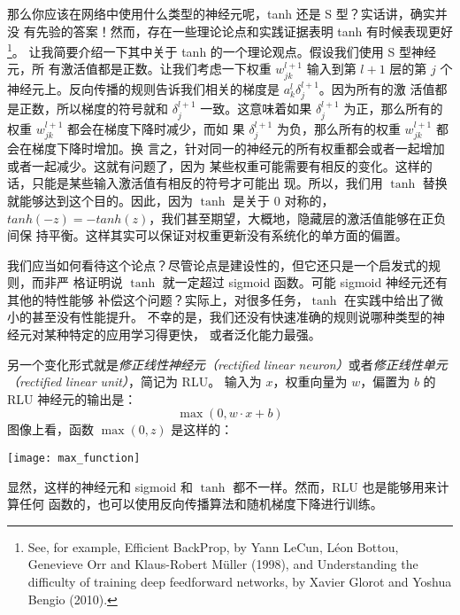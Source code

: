 那么你应该在网络中使用什么类型的神经元呢，tanh 还是 S 型？实话讲，确实并没
有先验的答案！然而，存在一些理论论点和实践证据表明 tanh 有时候表现更好\footnote{See, for example, Efficient BackProp, by Yann LeCun, Léon Bottou, Genevieve Orr and Klaus-Robert Müller (1998), and Understanding the difficulty of training deep feedforward networks, by Xavier Glorot and Yoshua Bengio (2010).}。
让我简要介绍一下其中关于 tanh 的一个理论观点。假设我们使用 S 型神经元，所
有激活值都是正数。让我们考虑一下权重 $w_{jk}^{l+1}$ 输入到第 $l+1$ 层的第 $j$ 个
神经元上。反向传播的规则告诉我们相关的梯度是 $a_k^l\delta_j^{l+1}$。因为所有的激
活值都是正数，所以梯度的符号就和 $\delta_j^{l+1}$ 一致。这意味着如果
$\delta_j^{l+1}$ 为正，那么所有的权重 $w_{jk}^{l+1}$ 都会在梯度下降时减少，而如
果 $\delta_j^{l+1}$ 为负，那么所有的权重 $w_{jk}^{l+1}$ 都会在梯度下降时增加。换
言之，针对同一的神经元的所有权重都会或者一起增加或者一起减少。这就有问题了，因为
某些权重可能需要有相反的变化。这样的话，只能是某些输入激活值有相反的符号才可能出
现。所以，我们用 $\tanh$ 替换就能够达到这个目的。因此，因为 $\tanh$ 是关于 $0$
对称的，$tanh(-z)=-tanh(z)$，我们甚至期望，大概地，隐藏层的激活值能够在正负间保
持平衡。这样其实可以保证对权重更新没有系统化的单方面的偏置。

我们应当如何看待这个论点？尽管论点是建设性的，但它还只是一个启发式的规则，而非严
格证明说 $\tanh$ 就一定超过 sigmoid 函数。可能 sigmoid 神经元还有其他的特性能够
补偿这个问题？实际上，对很多任务，$\tanh$ 在实践中给出了微小的甚至没有性能提升。
不幸的是，我们还没有快速准确的规则说哪种类型的神经元对某种特定的应用学习得更快，
或者泛化能力最强。

另一个变化形式就是\emph{修正线性神经元（rectified linear
    neuron）}或者\emph{修正线性单元（rectified linear unit）}，简记为 RLU。
输入为 $x$，权重向量为 $w$，偏置为 $b$ 的 RLU 神经元的输出是：
\begin{equation}
  \max(0, w \cdot x+b)
  \label{eq:112}\tag{112}
\end{equation}
图像上看，函数 $\max(0,z)$ 是这样的：
\begin{center}
  \texttt{[image: max\_function]}
\end{center}

显然，这样的神经元和 sigmoid 和 $\tanh$ 都不一样。然而，RLU 也是能够用来计算任何
函数的，也可以使用反向传播算法和随机梯度下降进行训练。

